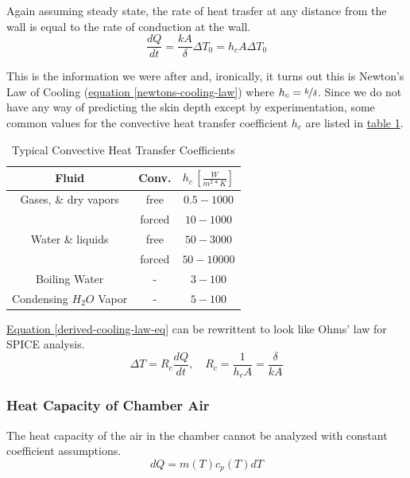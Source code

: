 \documentclass[10pt, twocolumn]{article}
\begin{document}
Again assuming steady state, the rate of heat trasfer at any distance from
the wall is equal to the rate of conduction at the wall.
\begin{equation}
\frac{dQ}{dt}=\frac{kA}{\delta}\Delta T_{0}=h_{c}A\Delta T_{0}
\label{derived-cooling-law-eq}
\end{equation}

This is the information we were after and, ironically, it turns out this is 
Newton's Law of Cooling
(\hyperref[newtons-cooling-law]{equation \ref{newtons-cooling-law}})
where $h_{c}=\nicefrac{k}{\delta}$. Since we do not have any way of predicting
the skin depth except by experimentation, some common values for
the convective heat transfer coefficient $h_{c}$ are listed in
\hyperref[typical-h-values-table]{table \ref{typical-h-values-table}}.

\begin{table}
	\centering
	\caption{Typical Convective Heat Transfer Coefficients}
	\begin{tabular}{c | c | c}
	\hline\hline
	Fluid	&Conv.	&$h_{c}\,\left[\frac{W}{m^{2}*K}\right]$	\\
	\hline
	Gases, \& dry vapors	&free	&$0.5-1000$	\\
				&forced	&$10-1000$	\\
	Water \& liquids	&free	&$50-3000$	\\
				&forced	&$50-10000$	\\
	Boiling Water		&-	&$3-100$	\\
	Condensing $H_{2}O$ Vapor&-	&$5-100$	\\
	\hline\hline
	\end{tabular}
	\label{typical-h-values-table}
\end{table}

\hyperref[derived-cooling-law-eq]{Equation \ref{derived-cooling-law-eq}}
can be rewrittent to look like Ohms' law for SPICE analysis.
\begin{equation}
\Delta T=R_{c}\frac{dQ}{dt},\quad R_{c}=\frac{1}{h_{c}A}=\frac{\delta}{kA}
\label{cooling-resistance-eq}
\end{equation}

\subsubsection*{Heat Capacity of Chamber Air}

The heat capacity of the air in the chamber cannot be analyzed
with constant coefficient assumptions.
\begin{equation}
dQ=m(T)c_{p}(T)dT
\label{specific-heat-with-variable-coefficients-eq}
\end{equation}
\end{document}
